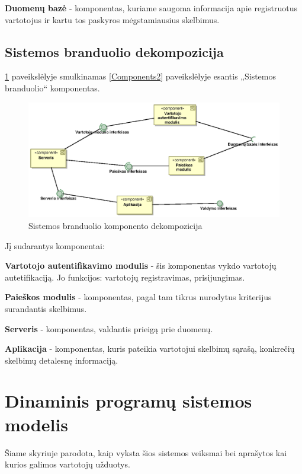 \documentclass[12pt]{article}
\begin{document}
	
	\textbf{Duomenų bazė} - komponentas, kuriame saugoma informacija apie registruotus vartotojus ir kartu tos paskyros mėgstamiausius skelbimus.
	\pagebreak

	\subsection{Sistemos branduolio dekompozicija}
	\ref{Components3} paveikslėlyje smulkinamas \ref{Components2} paveikslėlyje esantis „Sistemos branduolio“ komponentas.
	\begin{figure}[h]
		\begin{center}
			\includegraphics[width=\textwidth]{Komponentai3.eps}
			\caption{Sistemos branduolio komponento dekompozicija\label{Components3}}
		\end{center}
	\end{figure}

	 \bigbreak Jį sudarantys komponentai:\bigbreak
	
	\textbf{Vartotojo autentifikavimo modulis} - šis komponentas vykdo vartotojų autetifikaciją. Jo funkcijos: vartotojų registravimas, prisijungimas.
	
	\textbf{Paieškos modulis} - komponentas, pagal tam tikrus nurodytus kriterijus surandantis skelbimus.
	
	\textbf{Serveris} - komponentas, valdantis prieigą prie duomenų.
	
	\textbf{Aplikacija} - komponentas, kuris pateikia vartotojui skelbimų sąrašą, konkrečių skelbimų detalesnę informaciją.
	\pagebreak

	\section{Dinaminis programų sistemos modelis}
	Šiame skyriuje parodota, kaip vyksta šios sistemos veiksmai bei aprašytos kai kurios galimos vartotojų užduotys. 
	
\end{document}
